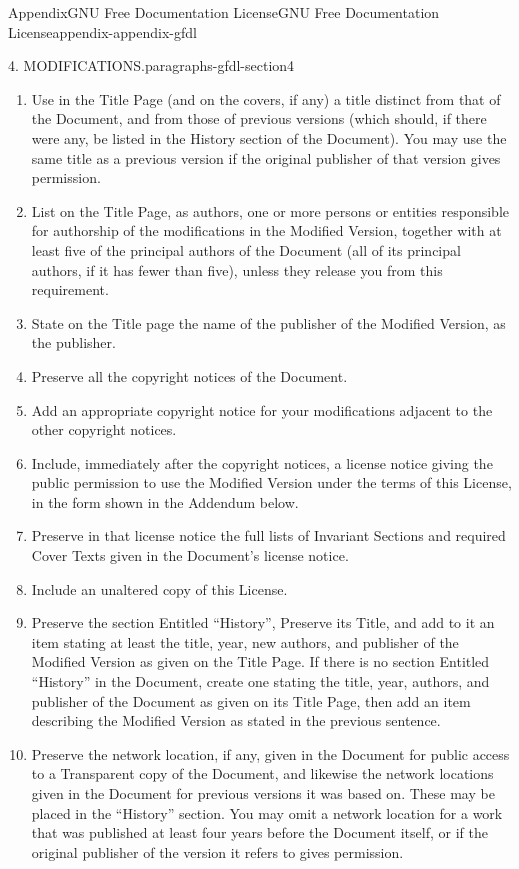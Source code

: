 \documentclass[twoside,10pt,]{book}
\numberwithin{equation}{part}
\begin{document}
\begin{appendixptx}{Appendix}{GNU Free Documentation License}{}{GNU Free Documentation License}{}{}{appendix-appendix-gfdl}
\begin{paragraphs}{4. MODIFICATIONS.}{paragraphs-gfdl-section4}
%
\begin{enumerate}[label=\Alph*.]
\item{}Use in the Title Page (and on the covers, if any) a title distinct from that of the Document, and from those of previous versions (which should, if there were any, be listed in the History section of the Document). You may use the same title as a previous version if the original publisher of that version gives permission.%
\item{}List on the Title Page, as authors, one or more persons or entities responsible for authorship of the modifications in the Modified Version, together with at least five of the principal authors of the Document (all of its principal authors, if it has fewer than five), unless they release you from this requirement.%
\item{}State on the Title page the name of the publisher of the Modified Version, as the publisher.%
\item{}Preserve all the copyright notices of the Document.%
\item{}Add an appropriate copyright notice for your modifications adjacent to the other copyright notices.%
\item{}Include, immediately after the copyright notices, a license notice giving the public permission to use the Modified Version under the terms of this License, in the form shown in the Addendum below.%
\item{}Preserve in that license notice the full lists of Invariant Sections and required Cover Texts given in the Document's license notice.%
\item{}Include an unaltered copy of this License.%
\item{}Preserve the section Entitled ``History'', Preserve its Title, and add to it an item stating at least the title, year, new authors, and publisher of the Modified Version as given on the Title Page. If there is no section Entitled ``History'' in the Document, create one stating the title, year, authors, and publisher of the Document as given on its Title Page, then add an item describing the Modified Version as stated in the previous sentence.%
\item{}Preserve the network location, if any, given in the Document for public access to a Transparent copy of the Document, and likewise the network locations given in the Document for previous versions it was based on.  These may be placed in the ``History'' section. You may omit a network location for a work that was published at least four years before the Document itself, or if the original publisher of the version it refers to gives permission.%

\end{enumerate}
\end{paragraphs}
\end{appendixptx}
\end{document}
